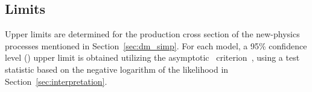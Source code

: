 \subsection{Limits}
\label{sec:limits}
Upper limits are determined for the production cross section of the new-physics processes mentioned in Section~\ref{sec:dm_simp}. 
For each model, a 95\% confidence level (\CL) upper limit is obtained utilizing the asymptotic \CLs\ criterion~\cite{Junk:1999kv,Read:2002hq,Cowan:2010js}, using a test statistic based on the negative logarithm of the likelihood in Section~\ref{sec:interpretation}.

\begin{figure}[htbp]
  \centering
\end{figure}

